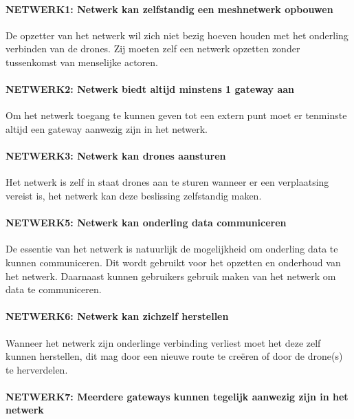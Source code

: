 \documentclass[a4paper, 11pt, oneside]{report}
\begin{document}
\paragraph{NETWERK1: Netwerk kan zelfstandig een meshnetwerk opbouwen}
\hypertarget{NETWERK1}{}

De opzetter van het netwerk wil zich niet bezig hoeven houden met het onderling verbinden van de drones. Zij moeten zelf een netwerk opzetten zonder tussenkomst van menselijke actoren.

\paragraph{NETWERK2: Netwerk biedt altijd minstens 1 gateway aan}
\hypertarget{NETWERK2}{}

Om het netwerk toegang te kunnen geven tot een extern punt moet er tenminste altijd een gateway aanwezig zijn in het netwerk.

\paragraph{NETWERK3: Netwerk kan drones aansturen}
\hypertarget{NETWERK3}{}

Het netwerk is zelf in staat drones aan te sturen wanneer er een verplaatsing vereist is, het netwerk kan deze beslissing zelfstandig maken.

\paragraph{NETWERK5: Netwerk kan onderling data communiceren}
\hypertarget{NETWERK5}{}

De essentie van het netwerk is natuurlijk de mogelijkheid om onderling data te kunnen communiceren. Dit wordt gebruikt voor het opzetten en onderhoud van het netwerk. Daarnaast kunnen gebruikers gebruik maken van het netwerk om data te communiceren.

\paragraph{NETWERK6: Netwerk kan zichzelf herstellen}
\hypertarget{NETWERK6}{}

Wanneer het netwerk zijn onderlinge verbinding verliest moet het deze zelf kunnen herstellen, dit mag door een nieuwe route te creëren of door de drone(s) te herverdelen.

\paragraph{NETWERK7: Meerdere gateways kunnen tegelijk aanwezig zijn in het netwerk}
\hypertarget{NETWERK7}{}
\end{document}
